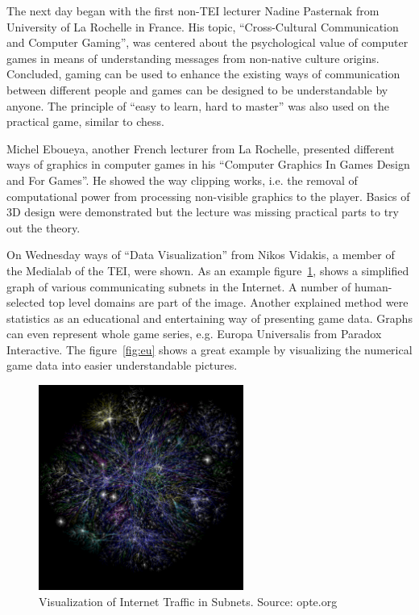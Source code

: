 \documentclass[bibtotocnumbered, headsepline,normalheadings,12pt]{report}
\begin{document}
The next day began with the first non-TEI lecturer Nadine Pasternak from University of La Rochelle in France. His topic, ``Cross-Cultural Communication and Computer Gaming'', was centered about the psychological value of computer games in means of understanding messages from non-native culture origins.
Concluded, gaming can be used to enhance the existing ways of communication between different people and games can be designed to be 
understandable by anyone. The principle of ``easy to learn, hard to master'' was also used on the practical game, similar to chess.

Michel Eboueya, another French lecturer from La Rochelle, presented different ways of graphics in computer games in his ``Computer Graphics In Games Design and For Games''. He showed the way clipping works, i.e. the removal of computational power from processing non-visible graphics to the player. Basics of 
3D design were demonstrated but the lecture was missing practical parts to try out the theory.

On Wednesday ways of ``Data Visualization'' from Nikos Vidakis, a member of the Medialab of the TEI, were shown. As an example figure~\ref{fig:opte}, shows
a simplified graph of various communicating subnets in the Internet. A number of human-selected top level domains are part of the image.
Another explained method were statistics as an educational and entertaining way of presenting game data. Graphs can even represent whole game 
series, e.g. Europa Universalis from Paradox Interactive. The figure~\ref{fig:eu} shows a great example by visualizing the numerical game data into
easier understandable pictures.


\begin{figure}[H]
    \centering
    \includegraphics[width=0.6\textwidth]{opte.png}%
    \caption{Visualization of Internet Traffic in Subnets. Source: opte.org}
    \label{fig:opte}%
\end{figure}
\end{document}
